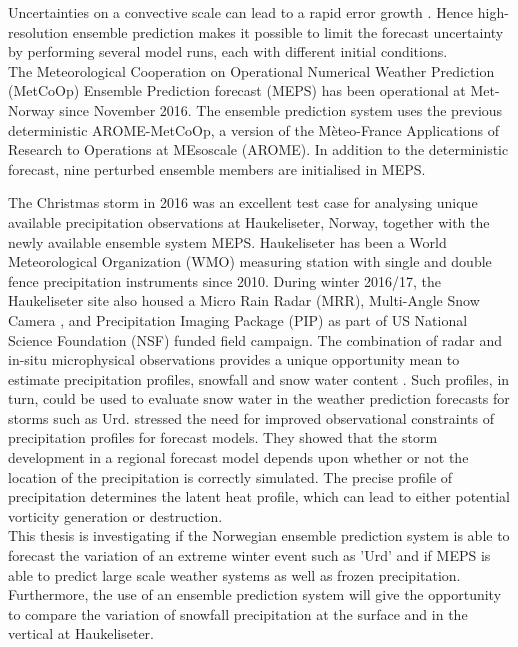 Uncertainties on a convective scale can lead to a rapid error growth \citep{lorenz_atmospheric_1969}. Hence high-resolution ensemble prediction makes it possible to limit the forecast uncertainty by performing several model runs, each with different initial conditions. %
\\
The Meteorological Cooperation on Operational Numerical Weather Prediction (MetCoOp) Ensemble Prediction forecast (MEPS) has been operational at Met-Norway since November 2016. The ensemble prediction system uses the previous deterministic AROME-MetCoOp, a version of the Mèteo-France Applications of Research to Operations at MEsoscale (AROME). In addition to the deterministic forecast, nine perturbed ensemble members are initialised in MEPS. 
\par\medskip
\noindent
The Christmas storm in 2016 was an excellent test case for analysing unique available precipitation observations at Haukeliseter, Norway, together with the newly available ensemble system MEPS.
Haukeliseter has been a World Meteorological Organization (WMO) measuring station with single and double fence precipitation instruments since 2010. During winter 2016/17, the Haukeliseter site also housed a Micro Rain Radar (MRR), Multi-Angle Snow Camera \citep[MASC;][]{garrett_fall_2012}, and Precipitation Imaging Package (PIP) as part of US National Science Foundation (NSF) funded field campaign. The combination of radar and in-situ microphysical observations provides a unique opportunity mean to estimate precipitation profiles, snowfall and snow water content \citep{cooper_variational_2017}. Such profiles, in turn, could be used to evaluate snow water in the weather prediction forecasts for storms such as Urd. \citet{joos_influence_2012} stressed the need for improved observational constraints of precipitation profiles for forecast models. They showed that the storm development in a regional forecast model depends upon whether or not the location of the precipitation is correctly simulated.  The precise profile of precipitation determines the latent heat profile, which can lead to either potential vorticity generation or destruction. 
\\
This thesis is investigating if the Norwegian ensemble prediction system is able to forecast the variation of an extreme winter event such as 'Urd' and if MEPS is able to predict large scale weather systems as well as frozen precipitation. Furthermore, the use of an ensemble prediction system will give the opportunity to compare the variation of snowfall precipitation at the surface and in the vertical at Haukeliseter. 
